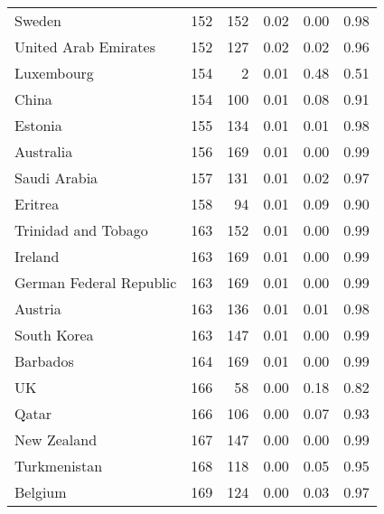 \begin{longtable}[t]{lrrrrr}
Sweden & 152 & 152 & 0.02 & 0.00 & 0.98\\
United Arab Emirates & 152 & 127 & 0.02 & 0.02 & 0.96\\
Luxembourg & 154 & 2 & 0.01 & 0.48 & 0.51\\
China & 154 & 100 & 0.01 & 0.08 & 0.91\\
Estonia & 155 & 134 & 0.01 & 0.01 & 0.98\\
\addlinespace
Australia & 156 & 169 & 0.01 & 0.00 & 0.99\\
Saudi Arabia & 157 & 131 & 0.01 & 0.02 & 0.97\\
Eritrea & 158 & 94 & 0.01 & 0.09 & 0.90\\
Trinidad and Tobago & 163 & 152 & 0.01 & 0.00 & 0.99\\
Ireland & 163 & 169 & 0.01 & 0.00 & 0.99\\
\addlinespace
German Federal Republic & 163 & 169 & 0.01 & 0.00 & 0.99\\
Austria & 163 & 136 & 0.01 & 0.01 & 0.98\\
South Korea & 163 & 147 & 0.01 & 0.00 & 0.99\\
Barbados & 164 & 169 & 0.01 & 0.00 & 0.99\\
UK & 166 & 58 & 0.00 & 0.18 & 0.82\\
\addlinespace
Qatar & 166 & 106 & 0.00 & 0.07 & 0.93\\
New Zealand & 167 & 147 & 0.00 & 0.00 & 0.99\\
Turkmenistan & 168 & 118 & 0.00 & 0.05 & 0.95\\
Belgium & 169 & 124 & 0.00 & 0.03 & 0.97\\
\bottomrule
\end{longtable}
